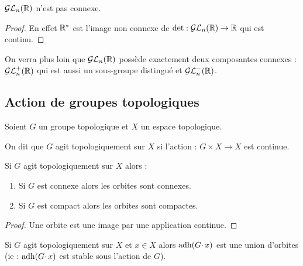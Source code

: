 \begin{prop}

$\mathcal{GL}_n(\mathbb{R})$ n'est pas connexe.
\end{prop}

\begin{proof}
 
En effet $\mathbb{R}^*$ est l'image non connexe de $\det : \mathcal{GL}_n(\mathbb{R}) \rightarrow \mathbb{R}$ qui
est continu.
\end{proof}

\begin{example}[Remarque]
On verra plus loin que $\mathcal{GL}_n(\mathbb{R})$ possède exactement deux composantes connexes
: $\mathcal{GL}_n^+(\mathbb{R})$ qui est aussi un sous-groupe distingué et $\mathcal{GL}^-_n(\mathbb{R})$.
\end{example}

\subsection{Action de groupes topologiques}
\vspace{0.5em}

\begin{defi}

Soient $G$ un groupe topologique et $X$ un espace topologique.

On dit que $G$ agit topologiquement sur $X$ si l'action : $G\times X\rightarrow
X$ est continue.
\end{defi}

\begin{prop}
 
Si $G$ agit topologiquement sur $X$ alors :
\begin{enumerate}
 \item Si $G$ est connexe alors les orbites sont connexes.
 \item Si $G$ est compact alors les orbites sont compactes.
\end{enumerate}
\end{prop}

\begin{proof}
Une orbite est une image par une application continue.
\end{proof}

\begin{prop}
 
Si $G$ agit topologiquement sur $X$ et $x \in X$ alors $\operatorname{adh} (G\cdotp x)$ est
une union d'orbites (ie : $\operatorname{adh} (G\cdotp x)$ est stable sous l'action de $G$).
\end{prop}

